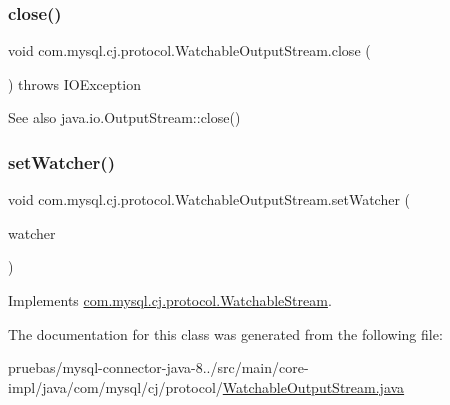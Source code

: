 \subsubsection{\texorpdfstring{close()}{close()}}
{\footnotesize\ttfamily void com.\+mysql.\+cj.\+protocol.\+Watchable\+Output\+Stream.\+close (\begin{DoxyParamCaption}{ }\end{DoxyParamCaption}) throws I\+O\+Exception}

\begin{DoxySeeAlso}{See also}
java.\+io.\+Output\+Stream\+::close() 
\end{DoxySeeAlso}
\mbox{\label{classcom_1_1mysql_1_1cj_1_1protocol_1_1_watchable_output_stream_a58495ba6a5906781f2dc6f0b861dd0b8}} 
\subsubsection{\texorpdfstring{set\+Watcher()}{setWatcher()}}
{\footnotesize\ttfamily void com.\+mysql.\+cj.\+protocol.\+Watchable\+Output\+Stream.\+set\+Watcher (\begin{DoxyParamCaption}\item[{\mbox{\hyperlink{interfacecom_1_1mysql_1_1cj_1_1protocol_1_1_output_stream_watcher}{Output\+Stream\+Watcher}}}]{watcher }\end{DoxyParamCaption})}



Implements \mbox{\hyperlink{interfacecom_1_1mysql_1_1cj_1_1protocol_1_1_watchable_stream_aa3a3e9b08ec23693950ef766decd7205}{com.\+mysql.\+cj.\+protocol.\+Watchable\+Stream}}.



The documentation for this class was generated from the following file\+:\begin{DoxyCompactItemize}
\item 
pruebas/mysql-\/connector-\/java-\/8../src/main/core-\/impl/java/com/mysql/cj/protocol/\mbox{\hyperlink{_watchable_output_stream_8java}{Watchable\+Output\+Stream.\+java}}\end{DoxyCompactItemize}
